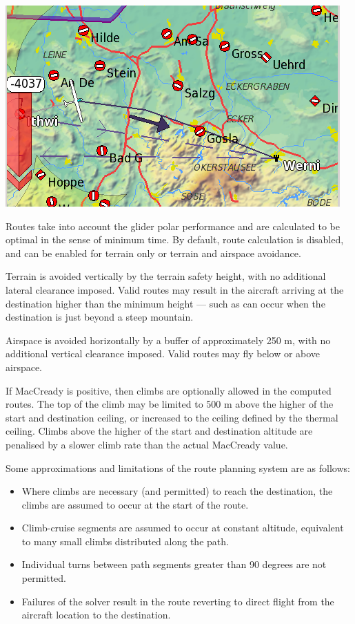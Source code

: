 \begin{center}
\includegraphics[angle=0,width=0.8\linewidth,keepaspectratio='true']{figures/route3.png}
\end{center}

Routes take into account the glider polar performance and are
calculated to be optimal in the sense of minimum time.  By default,
route calculation is disabled, and can be enabled for terrain only or
terrain and airspace avoidance. 

Terrain is avoided vertically by the terrain safety height,
with no additional lateral clearance imposed.
Valid routes may result in the aircraft arriving at the destination
higher than the minimum height --- such as can occur when the
destination is just beyond a steep mountain.

Airspace is avoided horizontally by a buffer of approximately 250 m,
with no additional vertical clearance imposed.  Valid routes may fly
below or above airspace.

If MacCready is positive, then climbs are optionally allowed
 in the computed routes.  The top of the climb
may be limited to 500 m above the higher of the start and destination
ceiling, or increased to the ceiling defined by the thermal ceiling.
  Climbs above the higher of the start and
destination altitude are penalised by a slower climb rate than the
actual MacCready value.

Some approximations and limitations of the route planning system are as follows:
\begin{itemize}
\item Where climbs are necessary (and permitted) to reach the destination,
the climbs are assumed to occur at the start of the route.
\item Climb-cruise segments are assumed to occur at constant altitude,
equivalent to many small climbs distributed along the path.
\item Individual turns between path segments greater than 90 degrees
  are not permitted.
\item Failures of the solver result in the route reverting to direct flight
from the aircraft location to the destination.
\end{itemize}
